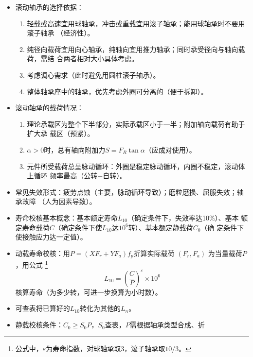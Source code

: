 \documentclass[12pt,a4paper]{article}
\newcommand{\tightlist}{\setlength{\parskip}{0pt}\setlength{\itemsep}{0pt}}
\newcommand{\hint}[1]{\textsf{（#1）}}
\newcommand{\minor}[1]{{\color{gray} #1}}
\begin{document}
\begin{itemize}
\begin{itemize}
{        应标出``/P$n$''}。
        \item 游隙代号：\minor{系列为$120345$}，一般为$0$并省略\minor{，否则应标出
        ``/C$n$''}。
    \end{itemize}
    \item 滚动轴承的选择依据：
    \begin{enumerate}\tightlist
        \item 轻载或高速宜用球轴承，冲击或重载宜用滚子轴承；能用球轴承时不要用滚子轴承
        \hint{经济性}。
        \item 纯径向载荷宜用向心轴承，纯轴向宜用推力轴承；同时承受径向与轴向载荷，需结
        合两者相对大小具体考虑。
        \item 考虑调心需求\hint{此时避免用圆柱滚子轴承}。
        \item 整体轴承座中的轴承，优先考虑外圈可分离的\hint{便于拆卸}。
    \end{enumerate}
    \item 滚动轴承的载荷情况：
    \begin{enumerate}\tightlist
        \item 理论承载区为整个下半部分，实际承载区小于一半；附加轴向载荷有助于扩大承
        载区\hint{预紧}。
        \item $\alpha>0$时，总有轴向附加力$S=F_R\tan\alpha$\hint{应成对使用}。
        \item 元件所受载荷总呈脉动循环：外圈是稳定脉动循环，内圈不稳定，滚动体上循环
        频率最高\hint{公转+自转}。
    \end{enumerate}
    \item 常见失效形式：疲劳点蚀\hint{主要，脉动循环导致}；磨粒磨损、屈服失效；轴承故障
    \hint{人为因素导致}。
    \item 寿命校核基本概念：基本额定寿命$L_{10}$\hint{确定条件下，失效率达10\%}、基本
    额定寿命载荷$C$\hint{确定条件下使$L_{10}$达$10^6$转}、基本额定静载荷$C_0$\hint{确
    定条件下使接触应力达一定值}。
    \item 动载寿命校核：用$P=(XF_r+YF_a)f_p$折算实际载荷 $(F_r,F_a)$ 为当量载荷$P$，用公式
    \footnote{公式中，$\varepsilon$为寿命指数，对球轴承取$3$，滚子轴承取$10/3$。}
    \begin{equation}
        L_{10}=\left(\frac CP\right)^\varepsilon\times10^6
    \end{equation}
    核算寿命\hint{为多少转，可进一步换算为小时数}。
    \item \minor{可查表将已算好的$L_{10}$转化为其他的$L_n$。}
    \item \minor{静载校核条件：$C_0\geq S_0P$，$S_0$查表，$P$需根据轴承类型合成、折
}
\end{itemize}
\end{document}
